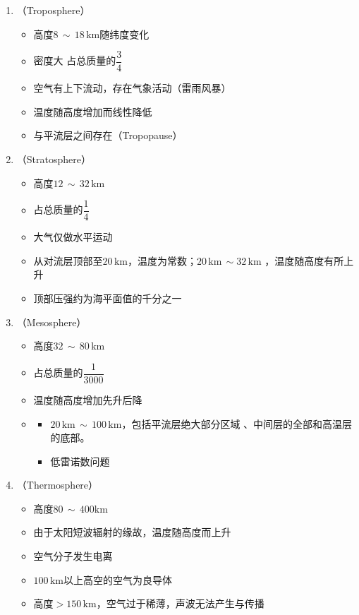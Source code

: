 \begin{enumerate}
	\item {}（Troposphere） \vspace*{-0.5em}
	\begin{itemize}
		\item 高度$ 8\, \sim \,  18 \,\text{km} $随纬度变化 
		\item 密度大 占总质量的$\dfrac{3}{4}$ 
		\item 空气有上下流动，存在气象活动（雷雨风暴） 
		\item 温度随高度增加而线性降低
		\item 与平流层之间存在（Tropopause）
	\end{itemize}
	
	\item {}（Stratosphere） \vspace*{-0.5em}
	\begin{itemize}
		\item 高度$ 12\, \sim \,  32 \,\text{km} $
		\item 占总质量的$\dfrac{1}{4}$
		\item 大气仅做水平运动 
		\item 从对流层顶部至$ 20 \, \text{km}$，温度为常数；$20 \, \text{km} \, \sim 32 \, \text{km}$ ，温度随高度有所上升
		\item 顶部压强约为海平面值的千分之一
	\end{itemize}
	
	\item {}（Mesosphere） \vspace*{-0.5em}
	\begin{itemize}
		\item 高度$ 32\, \sim \,  80 \,\text{km} $
		\item 占总质量的$\dfrac{1}{3000}$ 
		\item 温度随高度增加先升后降
		\item {} 
			\begin{itemize}
				\item $20 \, \text{km} \, \sim \, 100 \, \text{km}$，包括平流层绝大部分区域 、中间层的全部和高温层的底部。
				\item 低雷诺数问题
			\end{itemize}
	\end{itemize}
	
	\item {}（Thermosphere） \vspace*{-0.5em}
	\begin{itemize}
		\item 高度$ 80\, \sim \,  400 \text{km} $
		\item 由于太阳短波辐射的缘故，温度随高度而上升
		\item 空气分子发生电离
		\item $100 \, \text{km}$以上高空的空气为良导体
		\item 高度$> 150 \, \text{km}$，空气过于稀薄，声波无法产生与传播
	\end{itemize}
	

\end{enumerate}
